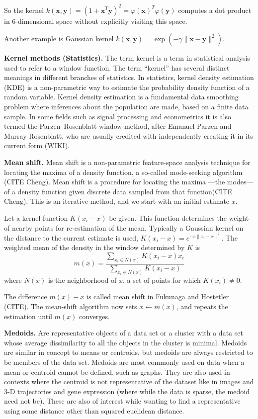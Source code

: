 \begin{description}
 So the kernel $k(\mathbf{x},\mathbf{y})=(1+ \mathbf{x}^{T} \mathbf{y})^{2} = \varphi(\mathbf{x})^T \varphi(\mathbf{y})$ computes a dot product in 6-dimensional space without explicitly visiting this space. 
 
 Another example is Gaussian kernel $k(\mathbf{x},\mathbf{y})=\exp(- \gamma\parallel \mathbf{x} - \mathbf{y}\parallel^2)$.
 
 \item \textbf{Kernel methods (Statistics).} The term kernel is a term in statistical analysis used to refer to a window function. The term ``kernel'' has several distinct meanings in different branches of statistics. In statistics, kernel density estimation (KDE) is a non-parametric way to estimate the probability density function of a random variable. Kernel density estimation is a fundamental data smoothing problem where inferences about the population are made, based on a finite data sample. In some fields such as signal processing and econometrics it is also termed the Parzen–Rosenblatt window method, after Emanuel Parzen and Murray Rosenblatt, who are usually credited with independently creating it in its current form (WIKI).
 
 
 \item \textbf{Mean shift.} Mean shift is a non-parametric feature-space analysis technique for locating the maxima of a density function, a so-called mode-seeking algorithm (CITE Cheng). Mean shift is a procedure for locating the maxima —the modes— of a density function given discrete data sampled from that function(CITE Cheng). This is an iterative method, and we start with an initial estimate $x$. 
 
 Let a kernel function $K(x_{i}-x)$ be given. This function determines the weight of nearby points for re-estimation of the mean. Typically a Gaussian kernel on the distance to the current estimate is used, $K(x_{i}-x)=e^{-c \parallel x_{i}-x \parallel ^{2}}$. The weighted mean of the density in the window determined by $K$ is $$ m(x) = \frac{ \sum_{x_i \in N(x)} K(x_i - x) x_i } {\sum_{x_i \in N(x)} K(x_i - x)}$$ where $N(x)$ is the neighborhood of $x$, a set of points for which $K(x_i) \neq 0$.
 
 The difference $m(x)-x$ is called mean shift in Fukunaga and Hostetler (CITE). The mean-shift algorithm now sets $x \leftarrow m(x)$, and repeats the estimation until $m(x)$ converges.
 
 \item \textbf{Medoids.} Are representative objects of a data set or a cluster with a data set whose average dissimilarity to all the objects in the cluster is minimal. Medoids are similar in concept to means or centroids, but medoids are always restricted to be members of the data set. Medoids are most commonly used on data when a mean or centroid cannot be defined, such as graphs. They are also used in contexts where the centroid is not representative of the dataset like in images and 3-D trajectories and gene expression (where while the data is sparse, the medoid need not be). These are also of interest while wanting to find a representative using some distance other than squared euclidean distance.
 

\end{description}
